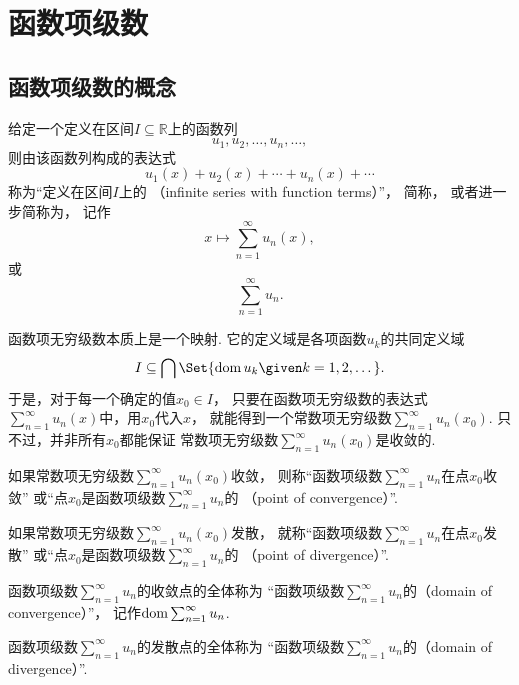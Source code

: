 \section{函数项级数}
\subsection{函数项级数的概念}
\begin{definition}\label{definition:无穷级数.实函数项级数的概念}
给定一个定义在区间\(I \subseteq \mathbb{R}\)上的函数列\begin{equation*}
	u_1,u_2,\dotsc,u_n,\dotsc,
\end{equation*}
则由该函数列构成的表达式\begin{equation*}
	u_1(x)+u_2(x)+\dotsb+u_n(x)+\dotsb
\end{equation*}
称为“定义在区间\(I\)上的
（infinite series with function terms）”，
简称，
或者进一步简称为，
记作\begin{equation*}
	x \mapsto \sum_{n=1}^\infty u_n(x),
\end{equation*}
或\begin{equation*}
	\sum_{n=1}^\infty u_n.
\end{equation*}
\end{definition}
\begin{remark}
函数项无穷级数本质上是一个映射.
它的定义域是各项函数\(u_k\)的共同定义域\begin{equation*}
	I \subseteq \bigcap\Set{ \dom u_k \given k=1,2,\dotsc }.
\end{equation*}
于是，对于每一个确定的值\(x_0 \in I\)，
只要在函数项无穷级数的表达式\(\sum_{n=1}^\infty u_n(x)\)中，用\(x_0\)代入\(x\)，
就能得到一个常数项无穷级数\(\sum_{n=1}^\infty u_n(x_0)\).
只不过，并非所有\(x_0\)都能保证
常数项无穷级数\(\sum_{n=1}^\infty u_n(x_0)\)是收敛的.
\end{remark}

\begin{definition}
如果常数项无穷级数\(\sum_{n=1}^\infty u_n(x_0)\)收敛，
则称“函数项级数\(\sum_{n=1}^\infty u_n\)在点\(x_0\)收敛”
或“点\(x_0\)是函数项级数\(\sum_{n=1}^\infty u_n\)的
（point of convergence）”.

如果常数项无穷级数\(\sum_{n=1}^\infty u_n(x_0)\)发散，
就称“函数项级数\(\sum_{n=1}^\infty u_n\)在点\(x_0\)发散”
或“点\(x_0\)是函数项级数\(\sum_{n=1}^\infty u_n\)的
（point of divergence）”.

函数项级数\(\sum_{n=1}^\infty u_n\)的收敛点的全体称为
“函数项级数\(\sum_{n=1}^\infty u_n\)的（domain of convergence）”，
记作\(\operatorname{dom} \sum_{n=1}^\infty u_n\).

函数项级数\(\sum_{n=1}^\infty u_n\)的发散点的全体称为
“函数项级数\(\sum_{n=1}^\infty u_n\)的（domain of divergence）”.
\end{definition}

